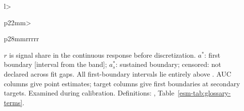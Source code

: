 \begin{table}[tp]
\begin{tabular}{l>{\raggedright\arraybackslash}p{22mm}>{\raggedright\arraybackslash}p{28mm}rrrrr}
\botrule
\end{tabular}
\par\smallskip\parbox{\linewidth}{$r$ is signal share in the continuous response before discretization. $a^*$: first boundary [interval from the band]; $a_s^*$: sustained boundary; censored: not declared across fit gaps. All  first-boundary intervals lie entirely above . AUC columns give point estimates; target columns give first boundaries at secondary targets. \dag{} Examined during calibration. Definitions: \esmresource, Table~\ref{esm-tab:glossary-terms}.}
\end{table}
